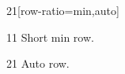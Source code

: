 \documentclass[paper=A4]{ropas-poster}
\begin{document}
\begin{postergrid}{2}{1}[row-ratio={min,auto}]
\begin{posterblock}{1}{1}
Short min row.
\end{posterblock}
\begin{posterblock}{2}{1}
Auto row.
\end{posterblock}
\end{postergrid}
\end{document}
